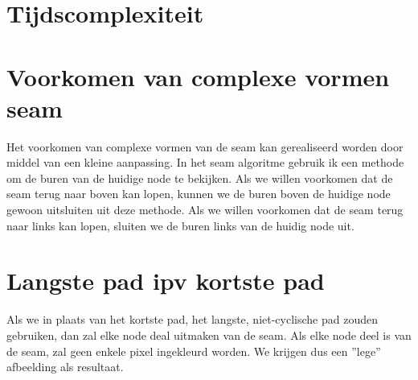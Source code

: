 \documentclass[11pt, a4paper]{article}
\begin{document}
\newpage
\section*{Tijdscomplexiteit}



\section*{Voorkomen van complexe vormen seam}
Het voorkomen van complexe vormen van de seam kan gerealiseerd worden door middel van een kleine aanpassing. In het seam algoritme gebruik ik een methode om de buren van de huidige node te bekijken. Als we willen voorkomen dat de seam terug naar boven kan lopen, kunnen we de buren boven de huidige node gewoon uitsluiten uit deze methode. Als we willen voorkomen dat de seam terug naar links kan lopen, sluiten we de buren links van de huidig node uit.
\section*{Langste pad ipv kortste pad}
Als we in plaats van het kortste pad, het langste, niet-cyclische pad zouden gebruiken, dan zal elke node deal uitmaken van de seam. Als elke node deel is van de seam, zal geen enkele pixel ingekleurd worden. We krijgen dus een ''lege'' afbeelding als resultaat.

\newpage
\end{document}
